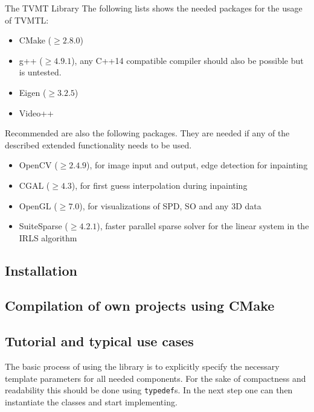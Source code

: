 \begin{chapter}{The TVMT Library}
The following lists shows the needed packages for the usage of TVMTL:
\begin{itemize}
    \item CMake ($\geq 2.8.0$)
    \item g++ ($\geq 4.9.1$), any C++14 compatible compiler should also be possible but is untested.
    \item Eigen ($\geq 3.2.5$)
    \item Video++
\end{itemize}

Recommended are also the following packages. They are needed if any of the described extended functionality needs to be used.
\begin{itemize}
    \item OpenCV ($\geq 2.4.9$), for image input and output, edge detection for inpainting
    \item CGAL ($\geq 4.3$), for first guess interpolation during inpainting
    \item OpenGL ($\geq 7.0$), for visualizations of SPD, SO and any 3D data
    \item SuiteSparse ($\geq 4.2.1$), faster parallel sparse solver for the linear system in the IRLS algorithm
\end{itemize}

\subsection{Installation} %
\label{sub:Installation}


\subsection{Compilation of own projects using CMake} %
\label{sub:CMakeCompilation}


\subsection{Tutorial and typical use cases} %
\label{sub:Tutorial and typical use cases}
The basic process of using the library is to explicitly specify the necessary template parameters for all needed components. 
For the sake of compactness and readability this should be done using \texttt{typedef}s. In the next step one can then
instantiate the classes and start implementing.\\


\end{chapter}

